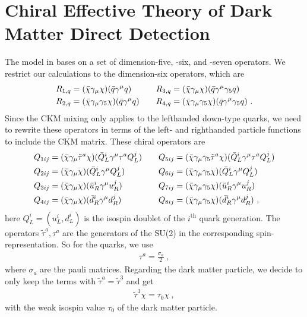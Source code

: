 \section{Chiral Effective Theory of Dark Matter Direct Detection}
The model in \cite{ChiralEFT} bases on a set of dimension-five, -six, and -seven operators. We restrict our calculations to the dimension-six operators, which are
\begin{align}\label{eq:normal}
	R_{1,q} &= (\bar{\chi}\gamma_\mu\chi)(\bar{q}\gamma^\mu q) && &R_{3,q} &= (\bar{\chi}\gamma_\mu\chi)(\bar{q}\gamma^\mu\gamma_5q)\notag \\
	R_{2,q} &= (\bar{\chi}\gamma_\mu\gamma_5\chi)(\bar{q}\gamma^\mu q) &&	&R_{4,q} &= (\bar{\chi}\gamma_\mu\gamma_5\chi)(\bar{q}\gamma^\mu\gamma_5q) \ .
\end{align}
Since the CKM mixing only applies to the lefthanded down-type quarks, we need to rewrite these operators in terms of the left- and righthanded particle functions to include the CKM matrix. These chiral operators are
\begin{align}\label{eq:chiral}
	Q_{1ij} &= (\bar{\chi}\gamma_\mu\tilde{\tau}^a\chi)(\bar{Q}_L^i\gamma^\mu \tau^aQ_L^j) && &Q_{5ij} &= (\bar{\chi}\gamma_\mu\gamma_5\tilde{\tau}^a\chi)(\bar{Q}_L^i\gamma^\mu \tau^aQ_L^j)\notag \\
	Q_{2ij} &= (\bar{\chi}\gamma_\mu\chi)(\bar{Q}_L^i\gamma^\mu Q_L^j) && &Q_{6ij} &= (\bar{\chi}\gamma_\mu\gamma_5\chi)(\bar{Q}_L^i\gamma^\mu Q_L^j)\notag \\
	Q_{3ij} &= (\bar{\chi}\gamma_\mu\chi)(\bar{u}_R^i\gamma^\mu u_R^j) && &Q_{7ij} &= (\bar{\chi}\gamma_\mu\gamma_5\chi)(\bar{u}_R^i\gamma^\mu u_R^j)\notag \\
	Q_{4ij} &= (\bar{\chi}\gamma_\mu\chi)(\bar{d}_R^i\gamma^\mu d_R^j) && &Q_{8ij} &= (\bar{\chi}\gamma_\mu\gamma_5\chi)(\bar{d}_R^i\gamma^\mu d_R^j) \ ,
\end{align}
here $Q_L^i = (u_L^i, d_L^i)$ is the isospin doublet of the $i^\text{th}$ quark generation. The operators $\tilde{\tau}^a,\tau^a$ are the generators of the SU(2) in the corresponding spin-representation. So for the quarks, we use
\begin{align}
	\tau^a = \frac{\sigma_a}{2} \ ,
\end{align}
where $\sigma_a$ are the pauli matrices. Regarding the dark matter particle, we decide to only keep the terms with $\tilde{\tau}^a = \tilde{\tau}^3$ and get
\begin{align}
	\tilde{\tau}^3\chi = \tau_0\chi \ ,
\end{align}
with the weak isospin value $\tau_0$ of the dark matter particle.

